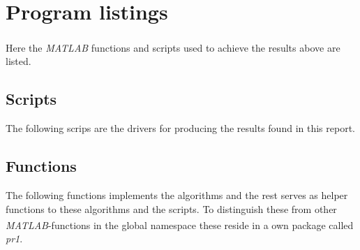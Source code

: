 \documentclass[10pt, a4paper]{article}
\newcommand{\matlab}{\small{\emph{MATLAB\textsuperscript{\textregistered}}}}
\begin{document}
\section{Program listings} \label{appendix+programs}
Here the \matlab{} functions and scripts used to achieve the results above are listed.

\subsection{Scripts}
The following scrips are the drivers for producing the results found in this report.












\subsection{Functions}
The following functions implements the algorithms and the rest serves as helper functions to these algorithms and the scripts. To distinguish these from other \matlab{}-functions in the global namespace these reside in a own package called \emph{pr1}.











\end{document}
